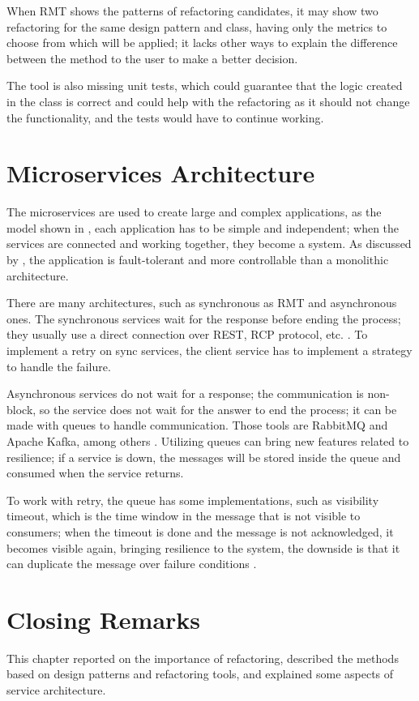 When RMT shows the patterns of refactoring candidates, it may show two refactoring for the same design pattern and class, having only the metrics to choose from which will be applied; it lacks other ways to explain the difference between the method to the user to make a better decision.

The tool is also missing unit tests, which could guarantee that the logic created in the class is correct and could help with the refactoring as it should not change the functionality, and the tests would have to continue working.

\section{Microservices Architecture}
\label{sec-microservices}
The microservices are used to create large and complex applications, as the model shown in , each application has to be simple and independent; when the services are connected and working together, they become a system. As discussed by \textcite{microservices-comuni}, the application is fault-tolerant and more controllable than a monolithic architecture.

There are many architectures, such as synchronous as RMT and asynchronous ones. The synchronous services wait for the response before ending the process; they usually use a direct connection over REST, RCP protocol, etc. \cite{microservices-comuni}. To implement a retry on sync services, the client service has to implement a strategy to handle the failure.

Asynchronous services do not wait for a response; the communication is non-block, so the service does not wait for the answer to end the process; it can be made with queues to handle communication. Those tools are RabbitMQ and Apache Kafka, among others \textcite{KARABEYAKSAKALLI2021111014}. Utilizing queues can bring new features related to resilience; if a service is down, the messages will be stored inside the queue and consumed when the service returns\cite{Cebeci2020DesignOA}. 

To work with retry, the queue has some implementations, such as visibility timeout, which is the time window in the message that is not visible to consumers; when the timeout is done and the message is not acknowledged, it becomes visible again, bringing resilience to the system, the downside is that it can duplicate the message over failure conditions \cite{ChenScalable}.

\section{Closing Remarks}
\label{sec2-remarks}
This chapter reported on the importance of refactoring, described the methods based on design patterns and refactoring tools, and explained some aspects of service architecture.

